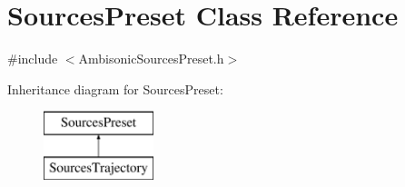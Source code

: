 \hypertarget{class_sources_preset}{\section{Sources\-Preset Class Reference}
\label{class_sources_preset}
}


{\ttfamily \#include $<$Ambisonic\-Sources\-Preset.\-h$>$}

Inheritance diagram for Sources\-Preset\-:\begin{figure}[H]
\begin{center}
\leavevmode
\includegraphics[height=2.000000cm]{class_sources_preset}
\end{center}
\end{figure}
